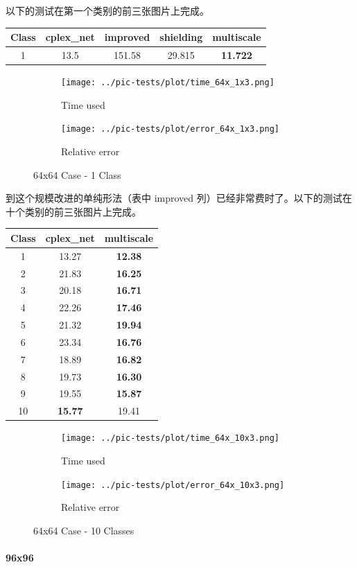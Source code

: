 \documentclass[]{article}
\let\oldparagraph\paragraph
\renewcommand{\paragraph}[1]{\oldparagraph{#1}\mbox{}}
\begin{document}
以下的测试在第一个类别的前三张图片上完成。

\begin{longtable}[]{@{}c|cccc@{}}
\hline
Class & cplex\_net & improved & shielding & multiscale\tabularnewline
\hline
1 & 13.5 & 151.58 & 29.815 & \textbf{11.722}\tabularnewline
\hline
\end{longtable}

\begin{figure}[htpb]
	\centering
	\begin{subfigure}{0.49 \textwidth}
		\centering
		\texttt{[image: ../pic-tests/plot/time\_64x\_1x3.png]}
		\caption{Time used}
	\end{subfigure}
	\begin{subfigure}{0.49 \textwidth}
		\centering
		\texttt{[image: ../pic-tests/plot/error\_64x\_1x3.png]}
		\caption{Relative error}
	\end{subfigure}
	\caption{64x64 Case - 1 Class}
\end{figure}

到这个规模改进的单纯形法（表中 improved
列）已经非常费时了。以下的测试在十个类别的前三张图片上完成。

\begin{longtable}[]{@{}c|cc@{}}
\hline
Class & cplex\_net & multiscale\tabularnewline
\hline
1 & 13.27 & \textbf{12.38}\tabularnewline
2 & 21.83 & \textbf{16.25}\tabularnewline
3 & 20.18 & \textbf{16.71}\tabularnewline
4 & 22.26 & \textbf{17.46}\tabularnewline
5 & 21.32 & \textbf{19.94}\tabularnewline
6 & 23.34 & \textbf{16.76}\tabularnewline
7 & 18.89 & \textbf{16.82}\tabularnewline
8 & 19.73 & \textbf{16.30}\tabularnewline
9 & 19.55 & \textbf{15.87}\tabularnewline
10 & \textbf{15.77} & 19.41\tabularnewline
\hline
\end{longtable}

\begin{figure}[htpb]
	\centering
	\begin{subfigure}{0.49 \textwidth}
		\centering
		\texttt{[image: ../pic-tests/plot/time\_64x\_10x3.png]}
		\caption{Time used}
	\end{subfigure}
	\begin{subfigure}{0.49 \textwidth}
		\centering
		\texttt{[image: ../pic-tests/plot/error\_64x\_10x3.png]}
		\caption{Relative error}
	\end{subfigure}
	\caption{64x64 Case - 10 Classes}
\end{figure}

\paragraph{96x96}
\end{document}
